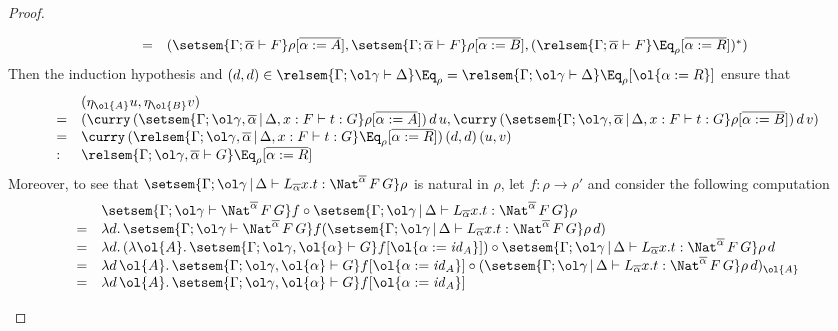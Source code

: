 \documentclass[acmsmall,review,anonymous]{acmart}
\theoremstyle{definition}
\renewcommand{\id}{\mathit{id}}
\begin{document}
\begin{proof}
\begin{itemize}
\[\begin{array}{lll}
&  = & (\setsem{\Gamma;\overline{\alpha} \vdash F}
\rho[\overline{\alpha := A}], \setsem{\Gamma;\overline{\alpha} \vdash
  F} \rho[\overline{\alpha := B}],
(\relsem{\Gamma;\overline{\alpha} \vdash F}
\Eq_{\rho}[\overline{\alpha := R}])^*)
\end{array}\]
Then the induction hypothesis and
$(d,d) \in \relsem{\Gamma;\ol\gamma \vdash \Delta} \Eq_\rho =
\relsem{\Gamma;\ol\gamma \vdash \Delta} \Eq_\rho[\ol{\alpha := R}]$
ensure that
\[\begin{array}{ll}
& (\eta_{\ol{A}}u,\eta_{\ol{B}}v)\\
= & (\curry\, (\setsem{\Gamma;\ol\gamma,\overline{\alpha} \,|\, \Delta, x : F
  \vdash t: G}\rho[\overline{\alpha := A}])\,d\,u, \curry\,
(\setsem{\Gamma;\ol\gamma,\overline{\alpha} \,|\, \Delta, x : F \vdash t:
  G}\rho[\overline{\alpha := B}])\,d\,v)\\
= & \curry\, (\relsem{\Gamma;\ol\gamma,\overline{\alpha} \,|\, \Delta, x : F
  \vdash t: G}\Eq_\rho[\overline{\alpha := R}])\,(d,d)\,(u,v)\\
: & \relsem{\Gamma;\ol\gamma,\overline{\alpha} \vdash G}
\Eq_{\rho}[\overline{\alpha := R}]  
\end{array}\]
Moreover, to see that
$\setsem{\Gamma;\ol\gamma \,|\, \Delta \vdash L_{\overline{\alpha}} x.t
: \Nat^{\overline{\alpha}} \,F \,G} \rho$
is natural in $\rho$,
let $f : \rho \to \rho'$ and consider the following computation
  \[\begin{array}{ll}
  &\setsem{\Gamma;\ol\gamma \vdash \Nat^{\overline{\alpha}} \,F \,G}f
  \circ
  \setsem{\Gamma;\ol\gamma \,|\, \Delta \vdash L_{\overline{\alpha}}
    x.t : \Nat^{\overline{\alpha}} \,F \,G}\rho \\
  = & \lambda d.\,
  \setsem{\Gamma;\ol\gamma \vdash \Nat^{\overline{\alpha}} \,F \,G}f
  (\setsem{\Gamma;\ol\gamma \,|\, \Delta \vdash L_{\overline{\alpha}}
    x.t : \Nat^{\overline{\alpha}} \,F \,G}\rho\, d) \\
  = & \lambda d.\,
  (\lambda \ol{A}.\, \setsem{\Gamma;\ol\gamma,\ol{\alpha} \vdash G}f[\ol{\alpha := \id_A}])
  \circ
  \setsem{\Gamma;\ol\gamma \,|\, \Delta \vdash L_{\overline{\alpha}}
    x.t : \Nat^{\overline{\alpha}} \,F \,G}\rho\, d \\
  = & \lambda d\, \ol{A}.\,
  \setsem{\Gamma;\ol\gamma,\ol{\alpha} \vdash G}f[\ol{\alpha := \id_A}]
  \circ
  (\setsem{\Gamma;\ol\gamma \,|\, \Delta \vdash L_{\overline{\alpha}}
    x.t : \Nat^{\overline{\alpha}} \,F \,G}\rho\, d)_{\ol{A}} \\
  = & \lambda d\, \ol{A}.\,
  \setsem{\Gamma;\ol\gamma,\ol{\alpha} \vdash G}f[\ol{\alpha := \id_A}]

\end{array}\]
\end{itemize}
\end{proof}
\end{document}
